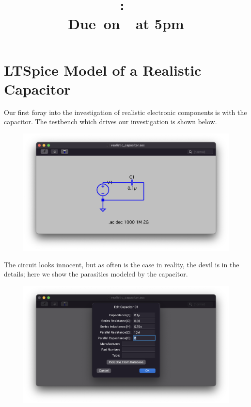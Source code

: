 \documentclass{article}
\title{
    \vspace{2in}
    \textmd{\textbf{\hmwkClass:\ \hmwkTitle}}\\
    \normalsize\vspace{0.1in}\small{Due\ on\ \hmwkDueDate\ at 5pm}\\
    \vspace{3in}
}
\author{\hmwkAuthorName}
\date{}
\begin{document}
\maketitle

\pagebreak
\section*{LTSpice Model of a Realistic Capacitor}

Our first foray into the investigation of realistic electronic components is with the capacitor.
The testbench which drives our investigation is shown below.
\begin{figure}[H]
    \includegraphics[width=\textwidth]{images/realistic_capacitor_setup.png}
\end{figure}
The circuit looks innocent, but  as often is the case in reality, the devil is in the details; here we show the parasitics modeled by the capacitor.
\begin{figure}[H]
    \includegraphics[width=\textwidth]{images/realistic_capacitor_setup_parasitics.png}
\end{figure}
\end{document}
